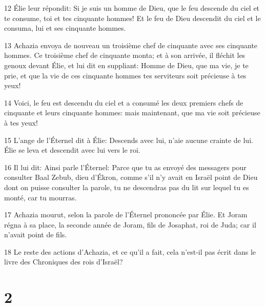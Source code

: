 \par 12 Élie leur répondit: Si je suis un homme de Dieu, que le feu descende du ciel et te consume, toi et tes cinquante hommes! Et le feu de Dieu descendit du ciel et le consuma, lui et ses cinquante hommes.
\par 13 Achazia envoya de nouveau un troisième chef de cinquante avec ses cinquante hommes. Ce troisième chef de cinquante monta; et à son arrivée, il fléchit les genoux devant Élie, et lui dit en suppliant: Homme de Dieu, que ma vie, je te prie, et que la vie de ces cinquante hommes tes serviteurs soit précieuse à tes yeux!
\par 14 Voici, le feu est descendu du ciel et a consumé les deux premiers chefs de cinquante et leurs cinquante hommes: mais maintenant, que ma vie soit précieuse à tes yeux!
\par 15 L'ange de l'Éternel dit à Élie: Descends avec lui, n'aie aucune crainte de lui. Élie se leva et descendit avec lui vers le roi.
\par 16 Il lui dit: Ainsi parle l'Éternel: Parce que tu as envoyé des messagers pour consulter Baal Zebub, dieu d'Ékron, comme s'il n'y avait en Israël point de Dieu dont on puisse consulter la parole, tu ne descendras pas du lit sur lequel tu es monté, car tu mourras.
\par 17 Achazia mourut, selon la parole de l'Éternel prononcée par Élie. Et Joram régna à sa place, la seconde année de Joram, fils de Josaphat, roi de Juda; car il n'avait point de fils.
\par 18 Le reste des actions d'Achazia, et ce qu'il a fait, cela n'est-il pas écrit dans le livre des Chroniques des rois d'Israël?

\chapter{2}

